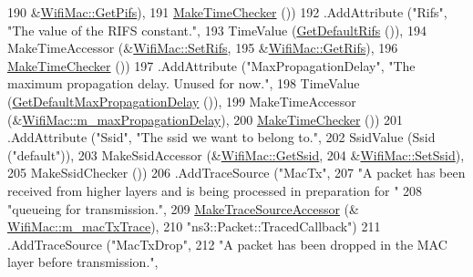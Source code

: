 \begin{DoxyCode}
190                                      &\hyperlink{classns3_1_1WifiMac_abdcc09dccf8365715f5a2ecd534edea1}{WifiMac::GetPifs}),
191                    \hyperlink{group__time_ga7032965bd4afa578691d88c09e4481c1}{MakeTimeChecker} ())
192     .AddAttribute (\textcolor{stringliteral}{"Rifs"}, \textcolor{stringliteral}{"The value of the RIFS constant."},
193                    TimeValue (\hyperlink{classns3_1_1WifiMac_aff9e93c259224db0d0f881a1f944fb89}{GetDefaultRifs} ()),
194                    MakeTimeAccessor (&\hyperlink{classns3_1_1WifiMac_a1aecc5dc30142884e09a80c9e708c56c}{WifiMac::SetRifs},
195                                      &\hyperlink{classns3_1_1WifiMac_a807f540d27ced3c3edfac7f9ee6efe9d}{WifiMac::GetRifs}),
196                    \hyperlink{group__time_ga7032965bd4afa578691d88c09e4481c1}{MakeTimeChecker} ())
197     .AddAttribute (\textcolor{stringliteral}{"MaxPropagationDelay"}, \textcolor{stringliteral}{"The maximum propagation delay. Unused for now."},
198                    TimeValue (\hyperlink{classns3_1_1WifiMac_a532b1611ce6a3ece041e4d2d9d582876}{GetDefaultMaxPropagationDelay} ()),
199                    MakeTimeAccessor (&\hyperlink{classns3_1_1WifiMac_a2f809d4b50f8a46eed67c464ac7a930d}{WifiMac::m\_maxPropagationDelay}),
200                    \hyperlink{group__time_ga7032965bd4afa578691d88c09e4481c1}{MakeTimeChecker} ())
201     .AddAttribute (\textcolor{stringliteral}{"Ssid"}, \textcolor{stringliteral}{"The ssid we want to belong to."},
202                    SsidValue (Ssid (\textcolor{stringliteral}{"default"})),
203                    MakeSsidAccessor (&\hyperlink{classns3_1_1WifiMac_a7cced388e3d4aae6543daef8787c41a7}{WifiMac::GetSsid},
204                                      &\hyperlink{classns3_1_1WifiMac_a27d55677dca1e04e0c5bfc27039b880e}{WifiMac::SetSsid}),
205                    MakeSsidChecker ())
206     .AddTraceSource (\textcolor{stringliteral}{"MacTx"},
207                      \textcolor{stringliteral}{"A packet has been received from higher layers and is being processed in preparation
       for "}
208                      \textcolor{stringliteral}{"queueing for transmission."},
209                      \hyperlink{group__tracing_gab21a770b9855af4e8f69f7531ea4a6b0}{MakeTraceSourceAccessor} (&
      \hyperlink{classns3_1_1WifiMac_a57a7609a3453d7f8bb45990edca1811e}{WifiMac::m\_macTxTrace}),
210                      \textcolor{stringliteral}{"ns3::Packet::TracedCallback"})
211     .AddTraceSource (\textcolor{stringliteral}{"MacTxDrop"},
212                      \textcolor{stringliteral}{"A packet has been dropped in the MAC layer before transmission."},

\end{DoxyCode}
